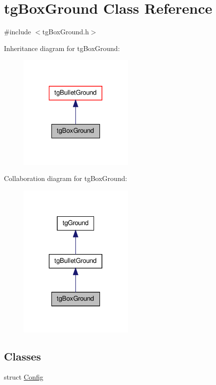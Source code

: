 \hypertarget{classtg_box_ground}{\section{tg\-Box\-Ground Class Reference}
\label{classtg_box_ground}
}


{\ttfamily \#include $<$tg\-Box\-Ground.\-h$>$}



Inheritance diagram for tg\-Box\-Ground\-:\nopagebreak
\begin{figure}[H]
\begin{center}
\leavevmode
\includegraphics[width=160pt]{classtg_box_ground__inherit__graph}
\end{center}
\end{figure}


Collaboration diagram for tg\-Box\-Ground\-:\nopagebreak
\begin{figure}[H]
\begin{center}
\leavevmode
\includegraphics[width=160pt]{classtg_box_ground__coll__graph}
\end{center}
\end{figure}
\subsection*{Classes}
\begin{DoxyCompactItemize}
\item 
struct \hyperlink{structtg_box_ground_1_1_config}{Config}
\end{DoxyCompactItemize}
